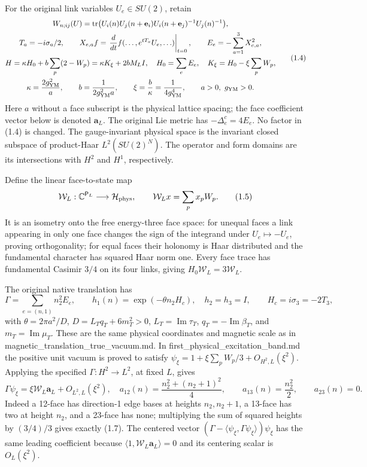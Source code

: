 \documentclass[
  11pt,
]{article}
\begin{document}
For the original link variables \(U_e\in SU(2)\), retain \[
\begin{gathered}
W_{n;ij}(U)=\operatorname{tr}
 \bigl(U_i(n)U_j(n+\mathbf e_i)
 U_i(n+\mathbf e_j)^{-1}U_j(n)^{-1}\bigr),\\
T_a=-i\sigma_a/2,\qquad
X_{e,a}f=\left.\frac{d}{dt}f(\ldots,e^{tT_a}U_e,\ldots)\right|_{t=0},
\qquad E_e=-\sum_{a=1}^3X_{e,a}^2,\\
H=\kappa H_0+b\sum_p(2-W_p)=\kappa K_\xi+2bM_LI,
\quad H_0=\sum_eE_e,\quad K_\xi=H_0-\xi\sum_pW_p,\\
\kappa=\frac{2g_{\rm YM}^2}{a},\qquad
b=\frac{1}{2g_{\rm YM}^2a},\qquad
\xi=\frac{b}{\kappa}=\frac1{4g_{\rm YM}^4},\qquad a>0,\ g_{\rm YM}>0.
\end{gathered}
\tag{1.4}
\] Here \(a\) without a face subscript is the physical lattice spacing;
the face coefficient vector below is denoted \(\boldsymbol a_L\). The
original Lie metric has \(-\Delta_e^c=4E_e\). No factor in (1.4) is
changed. The gauge-invariant physical space is the invariant closed
subspace of product-Haar \(L^2(SU(2)^N)\). The operator and form domains
are its intersections with \(H^2\) and \(H^1\), respectively.

Define the linear face-to-state map \[
\mathcal W_L:\mathbb C^{\mathsf P_L}\longrightarrow\mathcal H_{\rm phys},
\qquad \mathcal W_Lx=\sum_px_pW_p.
\tag{1.5}
\] It is an isometry onto the free energy-three face space: for unequal
faces a link appearing in only one face changes the sign of the
integrand under \(U_e\mapsto-U_e\), proving orthogonality; for equal
faces their holonomy is Haar distributed and the fundamental character
has squared Haar norm one. Every face trace has fundamental Casimir
\(3/4\) on its four links, giving \(H_0\mathcal W_L=3\mathcal W_L\).

The original native translation has \[
\Gamma=\sum_{e=(n,1)}n_2^2E_e,
\qquad h_1(n)=\exp(-\theta n_2H_c),\quad h_2=h_3=I,
\qquad H_c=i\sigma_3=-2T_3,
\tag{1.6}
\] with \(\theta=2\pi a^2/D\), \(D=L_Tq_T+6m_T^2>0\),
\(L_T=\operatorname{Im}\tau_T\), \(q_T=-\operatorname{Im}\beta_T\), and
\(m_T=\operatorname{Im}\mu_T\). These are the same physical coordinates
and magnetic scale as in magnetic\_translation\_true\_vacuum.md. In
first\_physical\_excitation\_band.md the positive unit vacuum is proved
to satisfy \(\psi_\xi=1+\xi\sum_pW_p/3+O_{H^2,L}(\xi^2)\). Applying the
specified \(\Gamma:H^2\to L^2\), at fixed \(L\), gives \[
\Gamma\psi_\xi=\xi\mathcal W_L\boldsymbol a_L+O_{L^2,L}(\xi^2),
\quad
\boxed{
a_{12}(n)=\frac{n_2^2+(n_2+1)^2}{4},\qquad
a_{13}(n)=\frac{n_2^2}{2},\qquad a_{23}(n)=0.}
\tag{1.7}
\] Indeed a 12-face has direction-1 edge bases at heights \(n_2,n_2+1\),
a 13-face has two at height \(n_2\), and a 23-face has none; multiplying
the sum of squared heights by \((3/4)/3\) gives exactly (1.7). The
centered vector \((\Gamma-\langle\psi_\xi,\Gamma\psi_\xi\rangle)
\psi_\xi\) has the same leading coefficient because
\(\langle1,\mathcal W_L\boldsymbol a_L\rangle=0\) and its centering
scalar is \(O_L(\xi^2)\).
\end{document}
